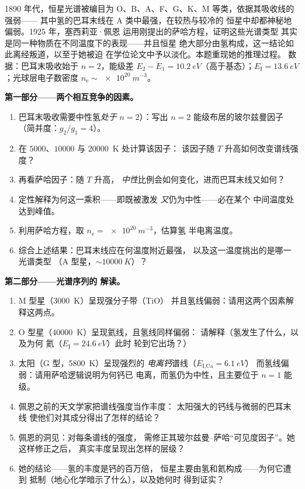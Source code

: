 \begin{problem}\label{pb:b3:grand-canonical:1}
1890 年代，恒星光谱被编目为
O、B、A、F、G、K、M 等类，依据其吸收线的强弱——
其中氢的巴耳末线在 A 类中最强，在较热与较冷的
恒星中却都神秘地偏弱。1925 年，塞西莉亚·佩恩
运用刚提出的萨哈方程，证明这些光谱类型
其实是同一种物质在不同温度下的表现——并且恒星
绝大部分由氢构成，这一结论如此离经叛道，以至于她被迫
在学位论文中予以淡化。本题重现她的推理过程。
数据：巴耳末吸收始于 $n = 2$，能级差 $E_2 - E_1 =
\qty{10.2}{eV}$（高于基态）；$E_{\text{I}} =
\qty{13.6}{eV}$；光球层电子数密度 $n_{\text{e}}
\sim \qty{e20}{m^{-3}}$。

\medskip\noindent\textbf{第一部分——两个相互竞争的因素。}
\begin{enumerate}
  \item 巴耳末吸收需要中性氢\emph{处于} $n =
        2$）：写出 $n = 2$ 能级布居的玻尔兹曼因子
        （简并度：$g_2/g_1 = 4$）。
  \item 在 $5000$、$10000$ 与 \qty{20000}{K} 处计算该因子：
        该因子随 $T$ 升高如何改变谱线强度？
  \item 再看萨哈因子：随 $T$ 升高，
        \emph{中性}比例会如何变化，进而巴耳末线又如何？
  \item 定性解释为何这一乘积——即既被激发
        \emph{又}仍为中性——必在某个
        中间温度处达到峰值。
  \item 利用萨哈方程，取 $n_{\text{e}} =
        \qty{e20}{m^{-3}}$，估算氢
        半电离温度。
  \item 综合上述结果：巴耳末线应在何温度附近最强，
        以及这一温度挑出的是哪一光谱类型
        （A 型星，$\sim\qty{10000}{K}$）？
\end{enumerate}

\medskip\noindent\textbf{第二部分——光谱序列的
解读。}
\begin{enumerate}[resume]
  \item M 型星（\qty{3000}{K}）呈现强分子带（TiO）
        并且氢线偏弱：请用这两个因素解释这两点。
  \item O 型星（\qty{40000}{K}）呈现氦线，且氢线同样偏弱：
        请解释（氢发生了什么，以及为何
        氦（$E_{\text{I}} = \qty{24.6}{eV}$）此时
        轮到它出场？）
  \item 太阳（G 型，\qty{5800}{K}）呈现强烈的
        \emph{电离钙}谱线（$E_{\text{I,Ca}} = \qty{6.1}{eV}$）
        而氢线偏弱：请用萨哈逻辑说明为何钙已
        电离，而氢仍为中性，且主要位于
        $n = 1$ 能级。
  \item 佩恩之前的天文学家把谱线强度当作丰度：
        太阳强大的钙线与微弱的巴耳末线
        使他们对其成分得出了怎样的结论？
  \item 佩恩的洞见：对每条谱线的强度，
        需修正其玻尔兹曼–萨哈“可见度因子”。她这样修正之后，
        真实丰度呈现出怎样的层级？
  \item 她的结论——氢的丰度是钙的百万倍，
        恒星主要由氢和氦构成——为何它遭到
        抵制（地心化学暗示了什么），以及她何时
        得到证实？
\end{enumerate}


\end{problem}
